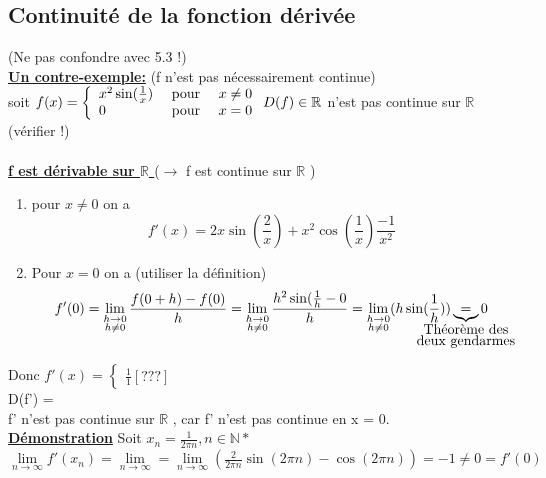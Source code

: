 \documentclass[12pt,a4paper]{article}
\newcommand{\limite}{\lim\limits_}
\newcommand{\evid}[1]{\textbf{\underline{#1}}}
\newcommand{\ninf}{\ensuremath{n \to \infty}}
\newcommand{\R}{\ensuremath{\mathbb{R}} }
\newcommand{\N}{\ensuremath{\mathbb{N}} }
\newcommand{\pour}{\mbox{ pour }}
\begin{document}
{\subsection{Continuité de la fonction dérivée}
(Ne pas confondre avec 5.3 !)\\
\evid{Un contre-exemple:} (f n'est pas nécessairement continue)\\
soit $f(x) = 
\left\{
\begin{array}{lll}
x^2\sin(\frac{1}{x}) & \pour & x \neq 0\\
0 & \pour & x = 0
\end{array}
\right.\\
D(f) \in \R$ n'est pas continue sur \R (vérifier !)\\
\\
\evid{f est dérivable sur \R} ($\to$ f est continue sur \R)
\begin{enumerate}[label=\roman*.]
	\item pour $x \neq 0$ on a 
		\begin{equation}
			f'(x) = 2x\sin(\frac{2}{x}) + x^2\cos(\frac{1}{x})\frac{-1}{x^2}
		\end{equation}
	\item Pour $x = 0$ on a (utiliser la définition)
		\begin{equation}
			f'(0) = \limite{\substack{h \to 0 \\ h \neq 0}} \frac{f(0+h) - f(0)}{h} = 
			\limite{\substack{h \to 0 \\ h \neq 0}}\frac{h^2\sin(\frac{1}{h}-0}{h} = \limite{\substack{h \to 0 \\ h \neq 0}} (h \sin(\frac{1}{h})) \underbrace{=}_{\mathclap{\substack{\mbox{Théorème des} \\ \mbox{deux gendarmes}}}} 0
		\end{equation}
\end{enumerate}
Donc $f'(x) = 
\left\{
\begin{array}{lll}
\frac{1}{1}[???]
\end{array}
\right.$\\
D(f') = \r\\
f' n'est pas continue sur \R, car f' n'est pas continue en x = 0.\\
\evid{Démonstration} Soit $x_n = \frac{1}{2\pi n}, n \in \N*$\\
$\limite{\ninf} f'(x_n) = \limite{\ninf} = \limite{\ninf}(\frac{2}{2\pi n}\sin(2\pi n)-\cos(2\pi n)) = -1 \neq 0 = f'(0)$\\
}
\end{document}
